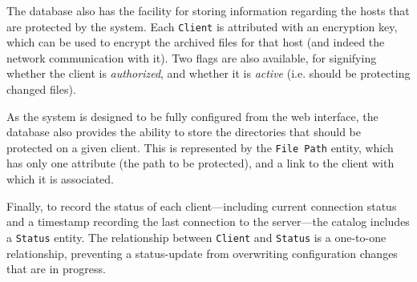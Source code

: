The database also has the facility for storing information regarding the hosts
that are protected by the system. Each \verb!Client! is attributed with an
encryption key, which can be used to encrypt the archived files for that host
(and indeed the network communication with it). Two flags are also available,
for signifying whether the client is \emph{authorized}, and whether it is
\emph{active} (i.e. should be protecting changed files).

As the system is designed to be fully configured from the web interface, the
database also provides the ability to store the directories that should be
protected on a given client. This is represented by the \verb!File Path!
entity, which has only one attribute (the path to be protected), and a link to
the client with which it is associated.

Finally, to record the status of each client---including current connection
status and a timestamp recording the last connection to the server---the
catalog includes a \verb!Status! entity. The relationship between \verb!Client!
and \verb!Status! is a one-to-one relationship, preventing a status-update from
overwriting configuration changes that are in progress.
